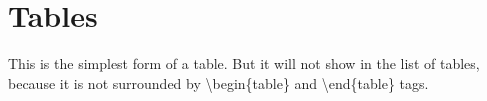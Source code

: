 \section{Tables}
This is the simplest form of a table. But it will not show in the list of tables, because it is not surrounded by \textbackslash begin\{table\} and \textbackslash end\{table\} tags.

